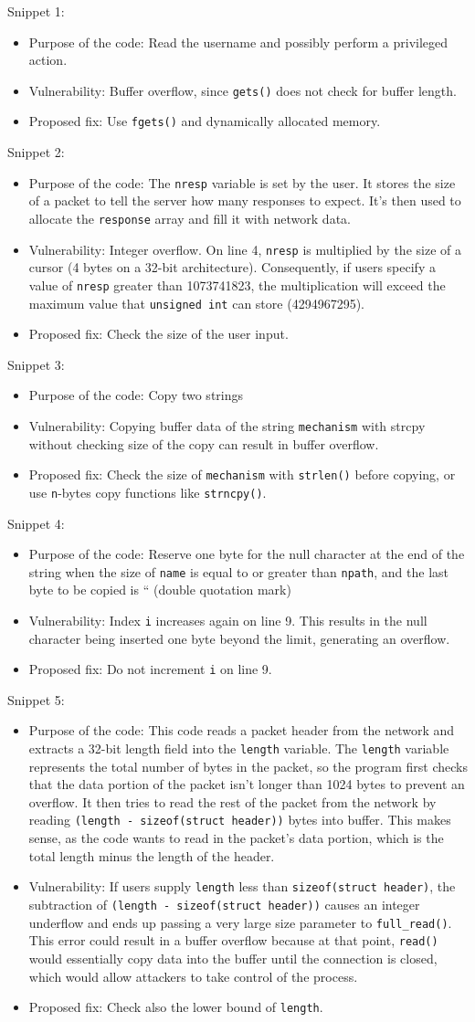 \documentclass[12pt,a4paper]{article}
\newcommand{\solution}[3]{
\begin{itemize}
\item Purpose of the code: #1
\item Vulnerability: #2
\item Proposed fix: #3
\end{itemize}
}
\begin{document}
\noindent
Snippet 1:
\solution
{Read the username and possibly perform a privileged action.}
{Buffer overflow, since \texttt{gets()} does not check for buffer length.}
{Use \texttt{fgets()} and dynamically allocated memory.}

\noindent
Snippet 2:
\solution
{The \texttt{nresp} variable is set by the user. It stores the size of a packet to tell the server how many responses to expect. It's then used to allocate the \texttt{response} array and fill it with network data.}
{Integer overflow. On line 4, \texttt{nresp} is multiplied by the size of a cursor (4 bytes on a 32-bit architecture). Consequently, if users specify a value of \texttt{nresp} greater than 1073741823, the multiplication will exceed the maximum value that \texttt{unsigned int} can store (4294967295).}
{Check the size of the user input.}

\noindent
Snippet 3:
\solution
{Copy two strings}
{Copying buffer data of the string \texttt{mechanism} with strcpy without checking size of the copy can result in buffer overflow.}
{Check the size of \texttt{mechanism} with \texttt{strlen()} before copying, or use \texttt{n}-bytes copy functions like \texttt{strncpy()}.}

\noindent
Snippet 4:
\solution
{Reserve one byte for the null character at the end of the string when the size of \texttt{name} is equal to or greater than \texttt{npath}, and the last byte to be copied is “ (double quotation mark)}
{Index \texttt{i} increases again on line 9. This results in the null character being inserted one byte beyond the limit, generating an overflow.}
{Do not increment \texttt{i} on line 9.}

\noindent
Snippet 5:
\solution
{This code reads a packet header from the network and extracts a 32-bit length
field into the \texttt{length} variable. The \texttt{length} variable represents the total number of bytes in the packet, so the program first checks that the data portion of the packet isn't longer than 1024 bytes to prevent an overflow. It then tries to read the rest of the packet from the network by reading \texttt{(length - sizeof(struct header))} bytes into buffer. This makes sense, as the code wants to read in the packet's data portion, which is the total length minus the length of the header.}
{If users supply \texttt{length} less than \texttt{sizeof(struct header)}, the subtraction of \texttt{(length - sizeof(struct header))} causes an integer underflow and ends up passing a very large size parameter to \texttt{full\_read()}. This error could result in a buffer overflow because at that point, \texttt{read()} would essentially copy data into the buffer until the connection is closed, which would allow attackers to take control of the process.}
{Check also the lower bound of \texttt{length}.}
\end{document}
